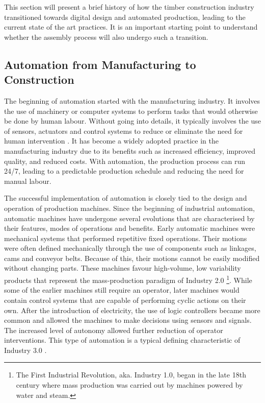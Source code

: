 This section will present a brief history of how the timber construction industry transitioned towards digital design and automated production, leading to the current state of the art practices. It is an important starting point to understand whether the assembly process will also undergo such a transition. 

\subsection{Automation from Manufacturing to Construction}
\label{subsection:introduction_automation_from_manufacturing_to_construction}

The beginning of automation started with the manufacturing industry. It involves the use of machinery or computer systems to perform tasks that would otherwise be done by human labour. Without going into details, it typically involves the use of sensors, actuators and control systems to reduce or eliminate the need for human intervention \parencite{nofSpringerHandbookAutomation2009}. It has become a widely adopted practice in the manufacturing industry due to its benefits such as increased efficiency, improved quality, and reduced costs. With automation, the production process can run 24/7, leading to a predictable production schedule and reducing the need for manual labour. 

The successful implementation of automation is closely tied to the design and operation of production machines. Since the beginning of industrial automation, automatic machines have undergone several evolutions that are characterised by their features, modes of operations and benefits. Early automatic machines were mechanical systems that performed repetitive fixed operations. Their motions were often defined mechanically through the use of components such as linkages, cams and conveyor belts. Because of this, their motions cannot be easily modified without changing parts. These machines favour high-volume, low variability products that represent the mass-production paradigm of Industry 2.0
\footnote{ The First Industrial Revolution, aka. Industry 1.0, began in the late 18th century where mass production was carried out by machines powered by water and steam.}.
While some of the earlier machines still require an operator, later machines would contain control systems that are capable of performing cyclic actions on their own. After the introduction of electricity, the use of logic controllers became more common and allowed the machines to make decisions using sensors and signals. The increased level of autonomy allowed further reduction of operator interventions. This type of automation is a typical defining characteristic of Industry 3.0 \parencite{mengesNewCyberPhysicalMaking2015,yinEvolutionProductionSystems2018}. 

